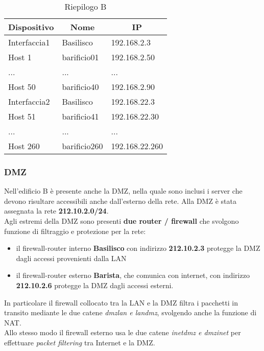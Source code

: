 \documentclass[a4paper,11pt]{article}
\begin{document}
\begin{table}[H]
\centering
\label{riepilogo}
\begin{tabular}{|l|l|l|}
\hline
\multicolumn{1}{|c|}{\textbf{Dispositivo}} & \multicolumn{1}{c|}{\textbf{Nome}} & \multicolumn{1}{c|}{\textbf{IP}} \\ \hline
Interfaccia1 & Basilisco & 192.168.2.3 \\ \hline
Host 1 & barificio01 & 192.168.2.50 \\ \hline
... & ... & ...\\ \hline
Host 50 & barificio40 & 192.168.2.90 \\ \hline
Interfaccia2 & Basilisco & 192.168.22.3 \\ \hline
Host 51 & barificio41 & 192.168.22.30 \\ \hline
... & ... & ...\\ \hline
Host 260 & barificio260 & 192.168.22.260 \\ \hline
\end{tabular}
\caption{Riepilogo B}
\end{table}


\subsubsection{DMZ}
Nell’edificio B è presente anche la DMZ, nella quale sono inclusi i server che devono risultare accessibili anche dall’esterno della rete. Alla DMZ è stata assegnata la rete \textbf{212.10.2.0/24}.\\
Agli estremi della DMZ sono presenti \textbf{due router / firewall} che svolgono funzione di filtraggio e protezione per la rete: 
\begin{itemize}
\item il firewall-router interno \textbf{Basilisco} con indirizzo \textbf{212.10.2.3}  protegge la DMZ dagli accessi provenienti dalla LAN
\item il firewall-router esterno \textbf{Barista}, che comunica con internet, con indirizzo \textbf{212.10.2.6} protegge la DMZ dagli accessi esterni.
\end{itemize}
In particolare il firewall collocato tra la LAN e la DMZ filtra i pacchetti in transito mediante le due catene \textit{dmzlan e landmz}, svolgendo anche la funzione di NAT.\\
Allo stesso modo il firewall esterno usa le due catene \textit{inetdmz e dmzinet} per effettuare \textit{packet filtering} tra Internet e la DMZ.
\end{document}
